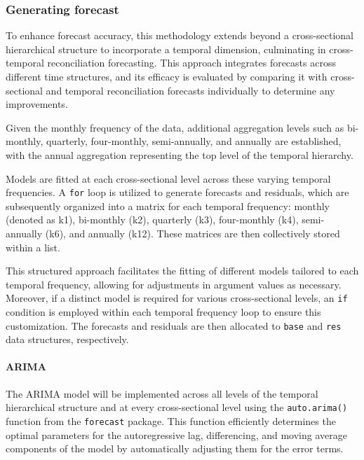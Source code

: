 \documentclass[11pt,a4paper,]{article}
\begin{document}
\subsubsection{Generating forecast}\label{generating-forecast}

To enhance forecast accuracy, this methodology extends beyond a cross-sectional hierarchical structure to incorporate a temporal dimension, culminating in cross-temporal reconciliation forecasting. This approach integrates forecasts across different time structures, and its efficacy is evaluated by comparing it with cross-sectional and temporal reconciliation forecasts individually to determine any improvements.

Given the monthly frequency of the data, additional aggregation levels such as bi-monthly, quarterly, four-monthly, semi-annually, and annually are established, with the annual aggregation representing the top level of the temporal hierarchy.

Models are fitted at each cross-sectional level across these varying temporal frequencies. A \texttt{for} loop is utilized to generate forecasts and residuals, which are subsequently organized into a matrix for each temporal frequency: monthly (denoted as k1), bi-monthly (k2), quarterly (k3), four-monthly (k4), semi-annually (k6), and annually (k12). These matrices are then collectively stored within a list.

This structured approach facilitates the fitting of different models tailored to each temporal frequency, allowing for adjustments in argument values as necessary. Moreover, if a distinct model is required for various cross-sectional levels, an \texttt{if} condition is employed within each temporal frequency loop to ensure this customization. The forecasts and residuals are then allocated to \texttt{base} and \texttt{res} data structures, respectively.

\paragraph{ARIMA}\label{arima}

The ARIMA model will be implemented across all levels of the temporal hierarchical structure and at every cross-sectional level using the \texttt{auto.arima()} function from the \texttt{forecast} package. This function efficiently determines the optimal parameters for the autoregressive lag, differencing, and moving average components of the model by automatically adjusting them for the error terms.
\end{document}
